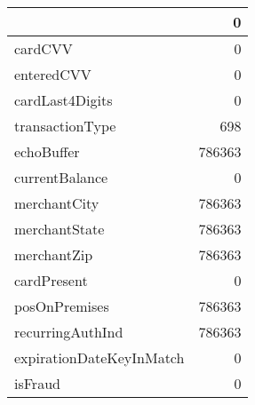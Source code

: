 \begin{tabu}{lr}
\toprule
 & 0 \\
\midrule
cardCVV & 0 \\
enteredCVV & 0 \\
cardLast4Digits & 0 \\
transactionType & 698 \\
echoBuffer & 786363 \\
currentBalance & 0 \\
merchantCity & 786363 \\
merchantState & 786363 \\
merchantZip & 786363 \\
cardPresent & 0 \\
posOnPremises & 786363 \\
recurringAuthInd & 786363 \\
expirationDateKeyInMatch & 0 \\
isFraud & 0 \\
\bottomrule
\end{tabu}